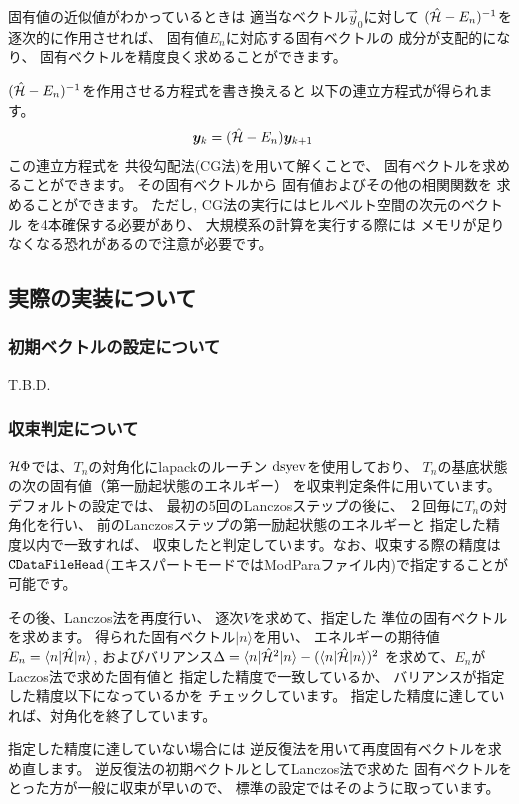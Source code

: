 固有値の近似値がわかっているときは
適当なベクトル$\vec{y}_{0}$に対して
$(\hat{\mathcal{H}}-E_{n})^{-1}$を
逐次的に作用させれば、
固有値$E_{n}$に対応する固有ベクトルの
成分が支配的になり、
固有ベクトルを精度良く求めることができます。

$(\hat{\mathcal{H}}-E_{n})^{-1}$を作用させる方程式を書き換えると
以下の連立方程式が得られます。
\begin{align}
\boldsymbol y_{k}&=(\hat{\mathcal{H}}-E_{n})\boldsymbol y_{k+1}
\end{align}
この連立方程式を
共役勾配法(CG法)を用いて解くことで、
固有ベクトルを求めることができます。
その固有ベクトルから
固有値およびその他の相関関数を
求めることができます。
ただし, CG法の実行にはヒルベルト空間の次元のベクトル
を4本確保する必要があり、
大規模系の計算を実行する際には
メモリが足りなくなる恐れがあるので注意が必要です。


\subsection{実際の実装について}
\subsubsection*{初期ベクトルの設定について}
T.B.D.

\subsubsection*{収束判定について}
$\mathcal{H} \Phi$では、$T_{n}$の対角化にlapackのルーチン
$\rm dsyev$を使用しており、
$T_{n}$の基底状態の次の固有値（第一励起状態のエネルギー）
を収束判定条件に用いています。
デフォルトの設定では、
最初の5回のLanczosステップの後に、
２回毎に$T_{n}$の対角化を行い、
前のLanczosステップの第一励起状態のエネルギーと
指定した精度以内で一致すれば、
収束したと判定しています。なお、収束する際の精度は$\verb|CDataFileHead| $(エキスパートモードではModParaファイル内)で指定することが可能です。

その後、Lanczos法を再度行い、
逐次$V$を求めて、指定した
準位の固有ベクトルを求めます。
得られた固有ベクトル$|n\rangle$を用い、
エネルギーの期待値$E_{n}=\langle n|\hat{\mathcal{H}}|n\rangle $,
およびバリアンス$\Delta=\langle n|\hat{\mathcal{H}}^{2}|n\rangle -(\langle n|\hat{\mathcal{H}}|n\rangle)^2$
を求めて、$E_{n}$がLaczos法で求めた固有値と
指定した精度で一致しているか、
バリアンスが指定した精度以下になっているかを
チェックしています。
指定した精度に達していれば、対角化を終了しています。

指定した精度に達していない場合には
逆反復法を用いて再度固有ベクトルを求め直します。
逆反復法の初期ベクトルとしてLanczos法で求めた
固有ベクトルをとった方が一般に収束が早いので、
標準の設定ではそのように取っています。

